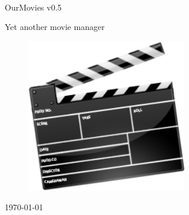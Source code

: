 % 
% 












	\begin{titlepage}
	
			
		\begin{center}
			 
		
			~ %
			\vspace{2.0cm}
			
			\begin{LARGE}OurMovies v0.5 \end{LARGE}
			
			\vspace{0.3cm}
			
			\begin{bf}Yet another movie manager\end{bf}
			
			\vspace{0.2cm}
	
			
		
			
			\begin{figure}[htbp]
				\centering
				\includegraphics[width=7cm]{images/logo_frontpage}
				\label{IMG_logo}
			\end{figure}

			\today		
			
			
		\end{center}
	\end{titlepage}
	\newpage

